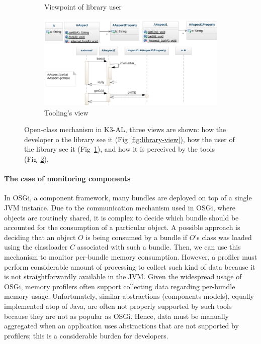 \begin{figure}[ht]
\begin{subfigure}[b]{0.45\textwidth}
\caption{Viewpoint of library user}\label{fig:user-view}
\end{subfigure}
\begin{subfigure} {\linewidth}
\centering
\includegraphics[width=0.9\linewidth]{chapter2/fig/tooling-view.png}
\caption{Tooling's view}\label{fig:tooling-view}
\end{subfigure}
\caption{Open-class mechanism in K3-AL, three views are shown: how the developer o the library see it (Fig \ref{fig:library-view}), how the user of the library see it (Fig~\ref{fig:user-view}), and how it is perceived by the tools (Fig~\ref{fig:tooling-view}).}
\label{fig:k3-diagram}
\end{figure}


\paragraph{The case of monitoring components}
In OSGi, a component framework, many bundles are deployed on top of a single JVM instance.
Due to the communication mechanism used in OSGi, where objects are routinely shared, it is complex to decide which bundle should be accounted for the consumption of a particular object.
A possible approach is deciding that an object $O$ is being consumed by a bundle if $O$'s class was loaded using the classloader $C$ associated with such a bundle.
Then, we can use this mechanism to monitor per-bundle memory consumption. 
However, a profiler must perform considerable amount of processing to collect such kind of data because it is not straightforwardly available in the JVM. 
Given the widespread usage of OSGi, memory profilers often support collecting data regarding per-bundle memory usage.
Unfortunately, similar abstractions (components models), equally implemented atop of Java, are often not properly supported by such tools because they are not as popular as OSGi.
Hence, data must be manually aggregated when an application uses abstractions that are not supported by profilers; this is a considerable burden for developers.

